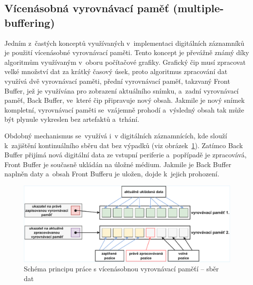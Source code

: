 \subsection{Vícenásobná vyrovnávací paměť (multiple-buffering)}
\label{vicenasobna_vyrovnavaci_pamet}
Jedním z~častých konceptů využívaných v~implementaci digitálních záznamníků je použití vícenásobné vyrovnávací paměti. Tento koncept je převážně známý díky algoritmům využívaným v~oboru počítačové grafiky. Grafický čip musí zpracovat velké množství dat za krátký časový úsek, proto algoritmus zpracování dat využívá dvě vyrovnávací paměti, přední vyrovnávací paměť, takzvaný Front Buffer, jež je využívána pro zobrazení aktuálního snímku, a~zadní vyrovnávací paměť, Back Buffer, ve~které čip připravuje nový obsah. Jakmile je nový snímek kompletní, vyrovnávací paměti se~vzájemně prohodí a~výsledný obsah tak může být plynule vykreslen bez artefaktů a~trhání.~\cite{buffering_chang, multiple_buffering_batch_saving, double_buffering_model}

Obdobný mechanismus se~využívá i~v digitálních záznamnících, kde slouží k~zajištění kontinuálního sběru dat bez výpadků (viz obrázek~\ref{fig:multiple-buffering-1}). Zatímco Back Buffer přijímá nová digitální data ze vstupní periferie a~popřípadě je zpracovává, Front Buffer je současně ukládán na úložné médium. Jakmile je Back Buffer naplněn daty a~obsah Front Bufferu je uložen, dojde k~jejich prohození.~\cite{buffering_chang, multiple_buffering_batch_saving, double_buffering_model}

\begin{figure}[h]
    \centering
    \includegraphics[width=1.00\textwidth]{obrazky-figures/multiple_buffering-1-1.pdf}
    
    \caption{Schéma principu práce s vícenásobnou vyrovnávací paměťí -- sběr dat}
    \label{fig:multiple-buffering-1}
\end{figure}

